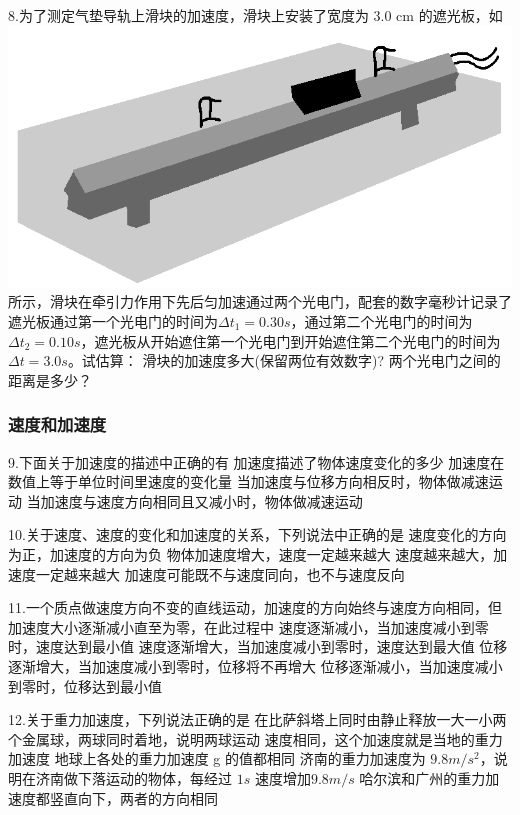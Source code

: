 \documentclass[a4paper,fontset = windows]{ctexbook} %
\begin{document}
\begin{jisuan}
   8.为了测定气垫导轨上滑块的加速度，滑块上安装了宽度为 3.0 cm 的遮光板，如
   \includegraphics{../picture/1-1/003.png}
所示，滑块在牵引力作用下先后匀加速通过两个光电门，配套的数字毫秒计记录了遮光板通过第一个光电门的时间为$\Delta t_1=0.30 s$，通过第二个光电门的时间为 $\Delta t_2=0.10 s$，遮光板从开始遮住第一个光电门到开始遮住第二个光电门的时间为 $\Delta t=3.0 s$。试估算：
\qitem 滑块的加速度多大(保留两位有效数字)?
\qitem 两个光电门之间的距离是多少？

\end{jisuan}

\subsubsection{速度和加速度}
\begin{xuanze}
   9.下面关于加速度的描述中正确的有
\choice[A]加速度描述了物体速度变化的多少
\choice[B]加速度在数值上等于单位时间里速度的变化量
\choice[C]当加速度与位移方向相反时，物体做减速运动
\choice[D]当加速度与速度方向相同且又减小时，物体做减速运动

10.关于速度、速度的变化和加速度的关系，下列说法中正确的是
\choice[A]速度变化的方向为正，加速度的方向为负
\choice[B]物体加速度增大，速度一定越来越大
\choice[C]速度越来越大，加速度一定越来越大
\choice[D]加速度可能既不与速度同向，也不与速度反向

11.一个质点做速度方向不变的直线运动，加速度的方向始终与速度方向相同，但加速度大小逐渐减小直至为零，在此过程中
\choice[A]速度逐渐减小，当加速度减小到零时，速度达到最小值
\choice[B]速度逐渐增大，当加速度减小到零时，速度达到最大值
\choice[C]位移逐渐增大，当加速度减小到零时，位移将不再增大
\choice[D]位移逐渐减小，当加速度减小到零时，位移达到最小值

12.关于重力加速度，下列说法正确的是
\choice[A]在比萨斜塔上同时由静止释放一大一小两个金属球，两球同时着地，说明两球运动
\choice[B] 速度相同，这个加速度就是当地的重力加速度
\choice[C]地球上各处的重力加速度 g 的值都相同
\choice[D]济南的重力加速度为 $9.8 m/s^2$，说明在济南做下落运动的物体，每经过 $1 s$ 速度增加$9.8 m/s$ 哈尔滨和广州的重力加速度都竖直向下，两者的方向相同

\end{xuanze}
\end{document}
